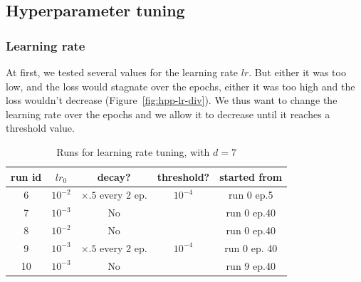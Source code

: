\documentclass{article}
\begin{document}
    \subsection{Hyperparameter tuning}
        \subsubsection{Learning rate}
            At first, we tested several values for the learning rate $lr$. But either it was too low, and the loss would stagnate over the epochs, either it was too high and the loss wouldn't decrease (Figure~\ref{fig:hpp-lr-div}). We thus want to change the learning rate over the epochs and we allow it to decrease until it reaches a threshold value.

            \begin{table}[!ht]
                \centering
                \begin{tabular}{|c|c|c|c|c|}
                    \hline
                    run id & $lr_0$ & decay? & threshold? & started from\\
                    \hline
                    \hline
                    6 & $10^{-2}$ & $\times .5$ every 2 ep. & $10^{-4}$ & run 0 ep.5 \\
                    \hline
                    7 & $10^{-3}$ & No & & run 0 ep.40 \\
                    \hline
                    8 & $10^{-2}$ & No & & run 0 ep.40 \\
                    \hline
                    9 & $10^{-3}$ & $\times .5$ every 2 ep. & $10^{-4}$ & run 0 ep. 40 \\
                    \hline
                    10 & $10^{-3}$ & No & & run 9 ep.40\\
                    \hline
                \end{tabular}
            \caption{Runs for learning rate tuning, with $d=7$}
            \end{table}
\end{document}
